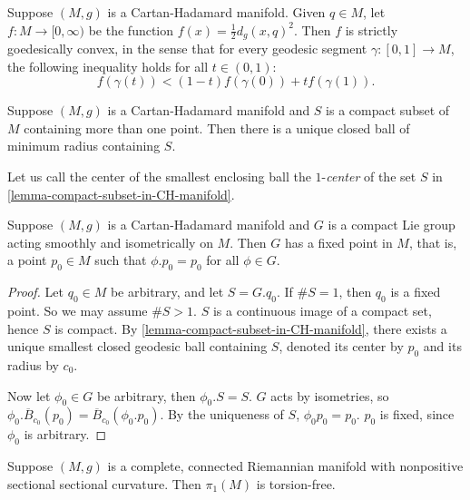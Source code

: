 \begin{lemma}
  \label{lemma-strictly-geodesically-convex-function}
  Suppose \( (M, g) \) is a Cartan-Hadamard manifold.
  Given \( q \in M \), let \( f: M \to [0, \infty) \) be the function \( f(x) = \frac{1}{2} d_g(x, q)^2 \).
  Then \( f \) is strictly goedesically convex, in the sense that for every geodesic segment \( \gamma: [0, 1] \to M \), the following inequality holds for all \( t \in (0, 1) \):
  \[
    f(\gamma(t)) < (1 - t)f(\gamma(0)) + t f(\gamma(1)).
  \]
\end{lemma}

\begin{lemma}
  \label{lemma-compact-subset-in-CH-manifold}
  Suppose \( (M, g) \) is a Cartan-Hadamard manifold and \( S \) is a compact subset of \( M \) containing more than one point.
  Then there is a unique closed ball of minimum radius containing \( S \).
\end{lemma}

Let us call the center of the smallest enclosing ball the \( 1 \)-\emph{center} of the set \( S \) in \ref{lemma-compact-subset-in-CH-manifold}.

\begin{theorem}
  \label{theorem-Cartan-fixed-point}
  Suppose \( (M, g) \) is a Cartan-Hadamard manifold and \( G \) is a compact Lie group acting smoothly and isometrically on \( M \).
  Then \( G \) has a fixed point in \( M \), that is, a point \( p_0 \in M \) such that \( \phi . p_0 = p_0 \) for all \( \phi \in G \).
\end{theorem}
\begin{proof}
  Let \( q_0 \in M \)  be arbitrary, and let \( S = G . q_0 \).
  If \( \# S = 1 \), then \( q_0 \) is a fixed point.
  So we may assume \( \# S > 1 \).
  \( S \) is a continuous image of a compact set, hence \( S \) is compact.
  By \ref{lemma-compact-subset-in-CH-manifold}, there exists a unique smallest closed geodesic ball containing \( S \), denoted its center by \( p_0 \) and its radius by \( c_0 \).

  Now let \( \phi_0 \in G \) be arbitrary, then \( \phi_0 . S = S \).
  \( G \) acts by isometries, so \( \phi_0. \overline{B}_{c_0}(p_0) = \overline{B}_{c_0}(\phi_0.p_0) \).
  By the uniqueness of \( S \), \( \phi_0 p_0 = p_0 \).
  \( p_0 \) is fixed, since \( \phi_0 \) is arbitrary.
\end{proof}

\begin{corollary}
  \label{corollary-Cartan-Torsion-Theorem}
  Suppose \( (M, g) \) is a complete, connected Riemannian manifold with nonpositive sectional sectional curvature.
  Then \( \pi_1(M) \) is torsion-free.
\end{corollary}

